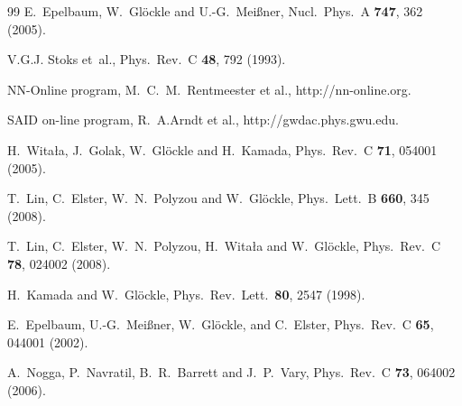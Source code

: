\documentclass[aps,rmp,nofootinbib,twocolumn,floatfix]{revtex4}
\begin{document}
\begin{thebibliography}{99}
  E.~Epelbaum, W.~Gl\"ockle and U.-G.~Mei\ss ner,
  Nucl.\ Phys.\  A {\bf 747}, 362 (2005).

V.G.J. Stoks et~al.,
Phys.\ Rev.\ C {\bf 48}, 792 (1993).

NN-Online program, M.~C.~M.~Rentmeester et al., http://nn-online.org.

SAID on-line program, R.~A.Arndt et al., http://gwdac.phys.gwu.edu.

  H.~Wita{\l}a, J.~Golak, W.~Gl\"ockle and H.~Kamada,
  Phys.\ Rev.\  C {\bf 71}, 054001 (2005).

  T.~Lin, C.~Elster, W.~N.~Polyzou and W.~Gl\"ockle,
  Phys.\ Lett.\  B {\bf 660}, 345 (2008).

  T.~Lin, C.~Elster, W.~N.~Polyzou, H.~Wita{\l}a and W.~Gl\"ockle,
  Phys.\ Rev.\  C {\bf 78}, 024002 (2008).

  H.~Kamada and W.~Gl\"ockle,
  Phys.\ Rev.\ Lett.\  {\bf 80}, 2547 (1998).

  E.~Epelbaum, U.-G.~Mei\ss ner, W.~Gl\"ockle, and C.~Elster,
  Phys.\ Rev.\ C {\bf 65}, 044001 (2002).

  A.~Nogga, P.~Navratil, B.~R.~Barrett and J.~P.~Vary,
  Phys.\ Rev.\  C {\bf 73}, 064002 (2006).


\end{thebibliography}
\end{document}
